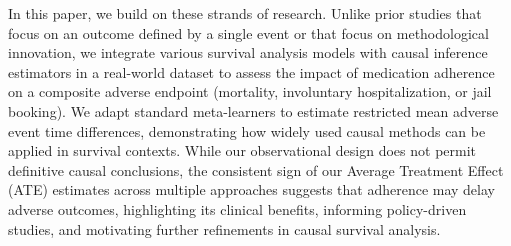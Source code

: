 In this paper, we build on these strands of research.
Unlike prior studies that focus on an outcome defined by a single event or that focus on methodological innovation, we integrate various survival analysis models with causal inference estimators in a real-world dataset to assess the impact of medication adherence on a composite adverse endpoint (mortality, involuntary hospitalization, or jail booking).
We adapt standard meta-learners to estimate restricted mean adverse event time differences, demonstrating how widely used causal methods can be applied in survival contexts.
While our observational design does not permit definitive causal conclusions, the consistent sign of our Average Treatment Effect (ATE) estimates across multiple approaches suggests that adherence may delay adverse outcomes, highlighting its clinical benefits, informing policy-driven studies, and motivating further refinements in causal survival analysis.

